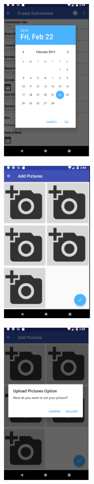 \documentclass[onecolumn, draftclsnofoot,10pt, compsoc]{IEEEtran}
\begin{document}
\begin{center}
\includegraphics[height=8cm]{datePickerFragment.png}
\end{center}

\begin{center}
\includegraphics[height=8cm]{add_pictures.png}
\end{center}

\begin{center}
\includegraphics[height=8cm]{add_pictures_choice.png}
\end{center}
\end{document}
